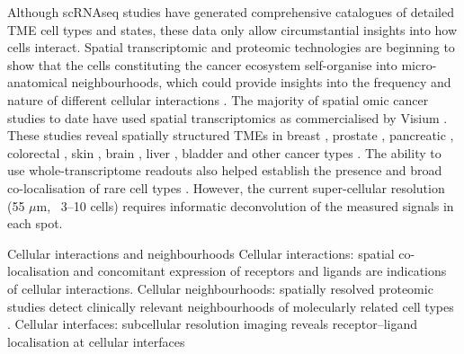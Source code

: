Although \ac{scRNAseq} studies have generated comprehensive catalogues of detailed TME cell types and states, these data only allow circumstantial insights into how cells interact. Spatial transcriptomic and proteomic technologies are beginning to show that the cells constituting the cancer ecosystem self-organise into micro-anatomical neighbourhoods, which could provide insights into the frequency and nature of different cellular interactions  . The majority of spatial omic cancer studies to date have used spatial transcriptomics as commercialised by \ac{Visium} . These studies reveal spatially structured TMEs in breast \parencite{Stahl2016-nq,Wu2021-uq,Andersson2021-pu}, prostate \parencite{Berglund2018-gh}, pancreatic \parencite{Moncada2020-ck}, colorectal \parencite{Qi2022-by}, skin \parencite{Ji2020-gn}, brain \parencite{Ravi2022-ut}, liver \parencite{Wu2021-wb}, bladder \parencite{Gouin2021-zx} and other cancer types \parencite{Erickson2022-zh,Barkley2022-gx}. The ability to use whole-transcriptome readouts also helped establish the presence and broad co-localisation of rare cell types . However, the current super-cellular resolution (55 $\mu$m, ~3–10 cells) requires informatic deconvolution of the measured signals in each spot.

    {Cellular interactions and neighbourhoods \parencite{Seferbekova2023-wg}}
    {Cellular interactions: spatial co-localisation and concomitant expression of receptors and ligands are indications of cellular interactions. Cellular neighbourhoods: spatially resolved proteomic studies detect clinically relevant neighbourhoods of molecularly related cell types \parencite{Danenberg2022-zb}. Cellular interfaces: subcellular resolution imaging reveals receptor–ligand localisation at cellular interfaces \parencite{Nirmal2022-sq}}

